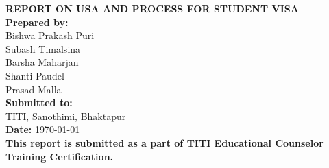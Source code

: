\documentclass[12pt,a4paper]{article}
\begin{document}
\begin{titlepage}
    \centering
    \rmfamily  %
    
    
    \vspace{1cm}
    {\LARGE \textbf{REPORT ON USA AND PROCESS FOR STUDENT VISA} \\[2em]}
    \vspace{1em}
    \textbf{Prepared by:} \\ [1em]
    Bishwa Prakash Puri \\
    Subash Timalsina\\
    Barsha Maharjan \\
    Shanti Paudel \\
    Prasad Malla \\[6em]
    \textbf{Submitted to:} \\TITI, Sanothimi, Bhaktapur \\[1em]
    \textbf{Date:} \today \\[2em]
    \vfill
    \textbf{This report is submitted as a part of TITI Educational Counselor Training Certification.}
    \vspace*{2em}
\end{titlepage}

\tableofcontents
\newpage










\end{document}
